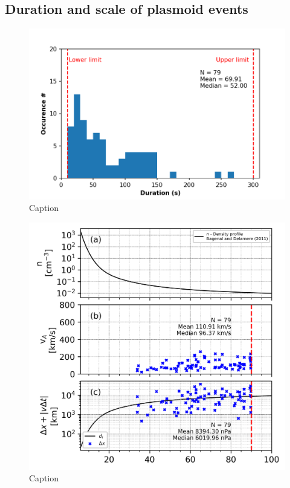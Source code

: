 \subsection{Duration and scale of plasmoid events}

\begin{figure}
    \centering
    \includegraphics{images5/duration_histogram.png}
    \caption{Caption}
    \label{fig:duration-histogram}
\end{figure}

\begin{figure}
    \centering
    \includegraphics[width=\textwidth]{images5/ion_inertial_selected.png}
    \caption{Caption}
    \label{fig:ion-inertial-scale}
\end{figure}

